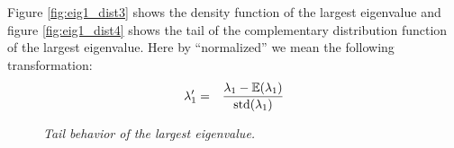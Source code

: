 \documentclass{article}
\begin{document}
Figure \ref{fig:eig1_dist3} shows the density function of the largest
eigenvalue and figure \ref{fig:eig1_dist4} shows the tail of the
complementary distribution function of the largest eigenvalue. Here by
``normalized'' we mean the following transformation:
\begin{eqnarray*}
  \lambda'_1 &=& {\lambda_1 - \mathbb{E}(\lambda_1) \over \text{std}(\lambda_1)}  
\end{eqnarray*}


\begin{figure}[htb!]
  \centering
  \hspace{5mm}
  \caption{\small \it Tail behavior of the largest eigenvalue.}
  \label{fig:eig1_dist_tail}
\end{figure}
\end{document}
